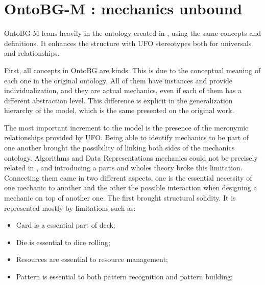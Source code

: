 \section{OntoBG-M : mechanics unbound}

OntoBG-M leans heavily in the ontology created in \cite{kritz_buildingOntology}, using the same concepts and definitions. It enhances the structure with UFO stereotypes both for universals and relationships.

First, all  concepts in OntoBG are kinds. This is due to the conceptual meaning of each one in the original ontology. All of them have instances and provide individualization, and they are actual mechanics, even if each of them has a different abstraction level. This difference is explicit in the generalization hierarchy of the model, which is the same presented on the original work.


The most important increment to the model is the presence of the meronymic relationships provided by UFO. Being able to identify mechanics to be part of one another brought the possibility of linking both sides of the mechanics ontology. Algorithms and Data Representations mechanics could not be precisely related in \citet{kritz_buildingOntology}, and introducing a parts and wholes theory broke this limitation. Connecting them came in two different aspects, one is the essential necessity of one mechanic to another and the other the possible interaction when designing a mechanic on top of another one. The first brought structural solidity. It is represented mostly by limitations such as:


\begin{itemize}
    \item Card is a essential part of deck;
    \item Die is essential to dice rolling;
    \item Resources are essential to resource management;
    \item Pattern is essential to both pattern recognition and pattern building;
\end{itemize}

